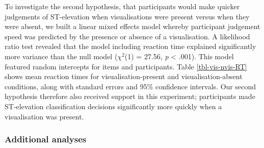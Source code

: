 \documentclass[
  10pt,
  letterpaper,
]{article}
\begin{document}
To investigate the second hypothesis, that participants would make
quicker judgements of ST-elevation when visualisations were present
versus when they were absent, we built a linear mixed effects model
whereby participant judgement speed was predicted by the presence or
absence of a visualisation. A likelihood ratio test revealed that the
model including reaction time explained significantly more variance than
the null model (\(\chi^2\)(1) = 27.56, \emph{p} \textless{} .001). This
model featured random intercepts for items and participants. Table
\ref{tbl-vis-nvis-RT} shows mean reaction times for
visualisation-present and visualisation-absent conditions, along with
standard errors and 95\% confidence intervals. Our second hypothesis
therefore also received support in this experiment; participants made
ST-elevation classification decisions significantly more quickly when a
visualisation was present.

\begin{table}

\caption{\label{tbl-vis-nvis-RT}Mean reaction times (RT) for
visualisation-present and visualisation-absent conditions, along with
standard errors and 95\% CIs. On average, participants were 0.53 s
quicker when a visualisation was present.}


\end{table}%

\subsubsection{Additional analyses}\label{sec-add-analyses}
\end{document}
